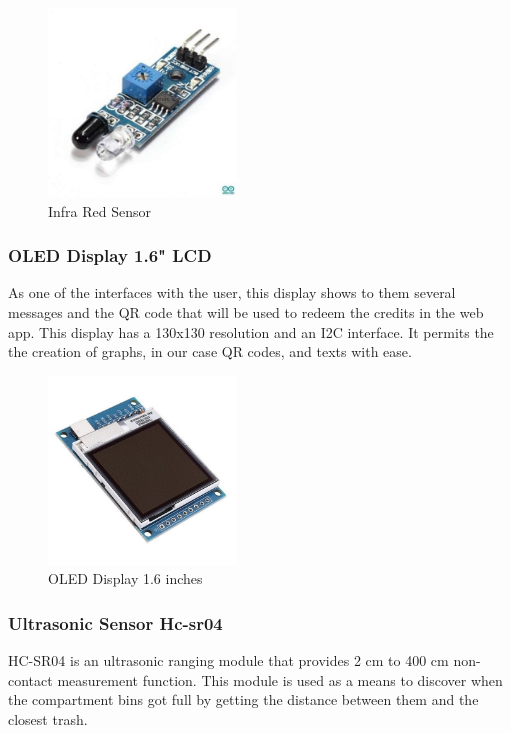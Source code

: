 \documentclass[a4paper,11pt]{article}
\begin{document}
\begin{figure}[H]
  \centering
  \includegraphics[width=5cm]{Figures/infraRed_sensor.jpg}
  \caption{\small{Infra Red Sensor}}
  \label{fig:ir}
\end{figure}

\subsubsection{OLED Display 1.6" \space LCD}
As one of the interfaces with the user, this display shows to them several messages and the QR code that will be used to redeem the credits in the web app. This display has a 130x130 resolution and an I2C interface. It permits the the creation of graphs, in our case QR codes, and texts with ease.

\begin{figure}[H]
  \centering
  \includegraphics[width=5cm]{Figures/Display-LCD-TFT-1.6-130x130-Transflectivo-6-600x600.jpg}
  \caption{\small{OLED Display 1.6 inches}}
  \label{fig:display}
\end{figure}

\subsubsection{Ultrasonic Sensor Hc-sr04}
HC-SR04 is an ultrasonic ranging module that provides 2 cm to 400 cm non-contact measurement function\cite{ultrasonic}. This module is used as a means to discover when the compartment bins got full by getting the distance between them and the closest trash.
\end{document}
